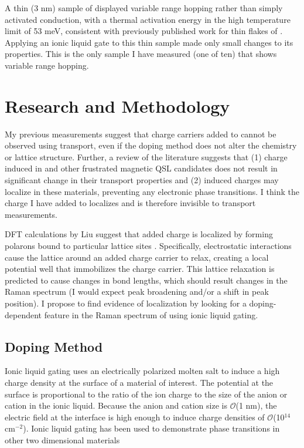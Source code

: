 \documentclass[11pt]{article}
\begin{document}
\begin{multicols}{2}
A thin (3 nm) sample of \rucl displayed variable range hopping rather than simply activated conduction, with a thermal activation energy in the high temperature limit of 53 meV, consistent with previously published work for thin flakes of \rucl \cite{Mashhadi2018}. Applying an ionic liquid gate to this thin sample made only small changes to its properties. This is the only sample I have measured (one of ten) that shows variable range hopping.

\section{Research and Methodology}

My previous measurements suggest that charge carriers added to \rucl cannot be observed using transport, even if the doping method does not alter the chemistry or lattice structure. Further, a review of the literature suggests that (1) charge induced in \rucl and other frustrated magnetic QSL candidates does not result in significant change in their transport properties and (2) induced charges may localize in these materials, preventing any electronic phase transitions. I think the charge I have added to \rucl localizes and is therefore invisible to transport measurements.

DFT calculations by Liu suggest that added charge is localized by forming polarons bound to particular lattice sites \cite{Liu2018}. Specifically, electrostatic interactions cause the lattice around an added charge carrier to relax, creating a local potential well that immobilizes the charge carrier. This lattice relaxation is predicted to cause changes in bond lengths, which should result changes in the Raman spectrum (I would expect peak broadening and/or a shift in peak position). I propose to find evidence of localization by looking for a doping-dependent feature in the Raman spectrum of \rucl using ionic liquid gating.

\subsection{Doping Method}

Ionic liquid gating uses an electrically polarized molten salt to induce a high charge density at the surface of a material of interest. The potential at the surface is proportional to the ratio of the ion charge to the size of the anion or cation in the ionic liquid. Because the anion and cation size is $\mathcal{O}$(1 nm), the electric field at the interface is high enough to induce charge densities of $\mathcal{O}$(10$^{14}$ cm$^{-2}$). Ionic liquid gating has been used to demonstrate phase transitions in other two dimensional materials


\end{multicols}
\end{document}
